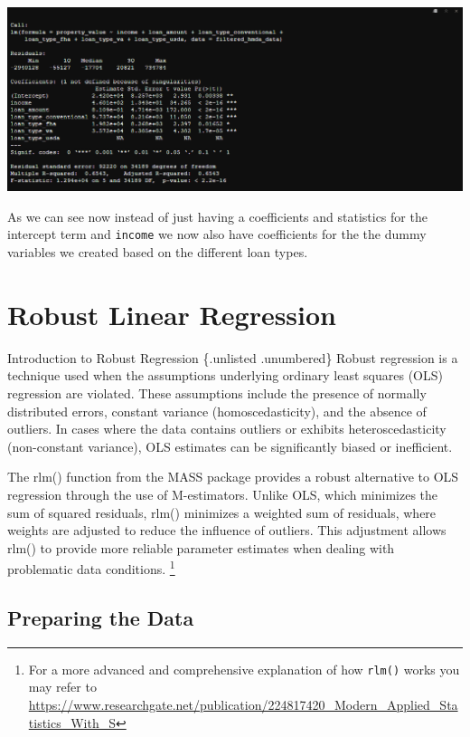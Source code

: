 \documentclass[
]{book}
\begin{document}
\includegraphics{images/mlm_summary.PNG}

As we can see now instead of just having a coefficients and statistics for the intercept term and \texttt{income} we now also have coefficients for the the dummy variables we created based on the different loan types.

\hypertarget{robust-linear-regression}{%
\section{Robust Linear Regression}\label{robust-linear-regression}}

Introduction to Robust Regression \{.unlisted .unumbered\} Robust regression is a technique used when the assumptions underlying ordinary least squares (OLS) regression are violated. These assumptions include the presence of normally distributed errors, constant variance (homoscedasticity), and the absence of outliers. In cases where the data contains outliers or exhibits heteroscedasticity (non-constant variance), OLS estimates can be significantly biased or inefficient.

The rlm() function from the MASS package provides a robust alternative to OLS regression through the use of M-estimators. Unlike OLS, which minimizes the sum of squared residuals, rlm() minimizes a weighted sum of residuals, where weights are adjusted to reduce the influence of outliers. This adjustment allows rlm() to provide more reliable parameter estimates when dealing with problematic data conditions. \footnote{For a more advanced and comprehensive explanation of how \texttt{rlm()} works you may refer to \url{https://www.researchgate.net/publication/224817420_Modern_Applied_Statistics_With_S}}

\hypertarget{preparing-the-data-2}{%
\subsection{Preparing the Data}\label{preparing-the-data-2}}
\end{document}
